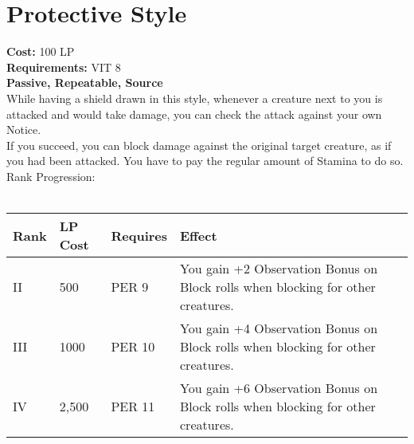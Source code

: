 \section{Protective Style}\label{perk:protectiveStyle}
\textbf{Cost:} 100 LP\\
\textbf{Requirements:} VIT 8\\
\textbf{Passive, Repeatable, Source}\\
While having a shield drawn in this style, whenever a creature next to you is attacked and would take damage, you can check the attack against your own Notice.\\
If you succeed, you can block damage against the original target creature, as if you had been attacked.
You have to pay the regular amount of Stamina to do so.\\
Rank Progression:\\
\\
\begin{longtable}{l | l | l | p{6cm}}
    Rank & LP Cost & Requires & Effect\\
    \hline
    II & 500 & PER 9 & You gain +2 Observation Bonus on Block rolls when blocking for other creatures.\\
    III & 1000 & PER 10 & You gain +4 Observation Bonus on Block rolls when blocking for other creatures.\\
    IV & 2,500 & PER 11 & You gain +6 Observation Bonus on Block rolls when blocking for other creatures.\\
\end{longtable}
